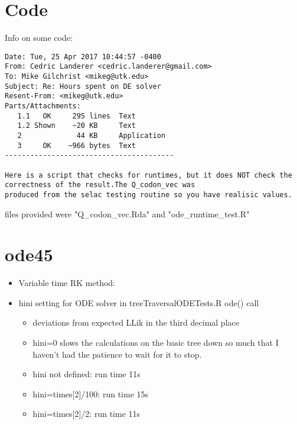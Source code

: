 \documentclass{article}
\begin{document}
\section*{Code}
Info on some code:
\begin{verbatim}
Date: Tue, 25 Apr 2017 10:44:57 -0400
From: Cedric Landerer <cedric.landerer@gmail.com>
To: Mike Gilchrist <mikeg@utk.edu>
Subject: Re: Hours spent on DE solver
Resent-From: <mikeg@utk.edu>
Parts/Attachments:
   1.1   OK     295 lines  Text
   1.2 Shown    ~20 KB     Text
   2             44 KB     Application
   3     OK    ~966 bytes  Text
----------------------------------------

Here is a script that checks for runtimes, but it does NOT check the correctness of the result.The Q_codon_vec was
produced from the selac testing routine so you have realisic values.
\end{verbatim}
files provided were "Q_codon_vec.Rda" and "ode_runtime_test.R"
\section*{ode45}
\begin{itemize}
\item Variable time RK method: 
\item hini setting for ODE solver in treeTraversalODETests.R ode() call
  \begin{itemize}
  \item deviations from expected LLik in the third decimal place
  \item  hini=0 slows the calculations on the basic tree down so much that I haven't had the patience to wait for it to stop.  
  \item hini not defined: run time 11s
  \item hini=times[2]/100: run time 15s
  \item hini=times[2]/2: run time 11s
  \end{itemize}

\end{itemize}
\end{document}
